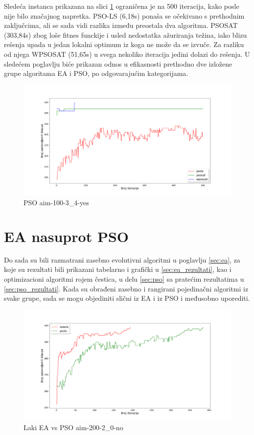\documentclass[a4paper]{article}
\begin{document}
Sledeća instanca prikazana na slici \ref{img:pso-100-3-4-yes} ograničena je na 500 iteracija,
kako posle nije bilo značajnog napretka. PSO-LS (6,18s) ponaša se očekivano s prethodnim
zaključcima, ali se sada vidi razlika između preostala dva algoritma. 
PSOSAT (303,84s) zbog loše fitnes funckije i usled nedostatka ažuriranja težina,
iako blizu rešenja upada u jedan lokalni optimum iz koga ne može da se izvuče. 
Za razliku od njega WPSOSAT (51,65s) u svega nekoliko iteracija jedini dolazi do rešenja.
U sledećem poglavlju biće prikazan odnos u efikasnosti prethodno dve izložene grupe algoritama
EA i PSO, po odgovarajućim kategorijama.\\

\begin{figure}[h!]
\centering
\includegraphics[width=\textwidth]{pso-aim-100-3_4-yes.png}
\caption{PSO aim-100-3\_4-yes}\label{img:pso-100-3-4-yes}
\end{figure}


\section{EA nasuprot PSO}
\label{EAvsPSO}
Do sada su bili razmatrani zasebno evolutivni algoritmi u poglavlju \ref{sec:ea}, za 
koje su rezultati bili prikazani tabelarno i grafički u \ref{sec:ea_rezultati}, kao i
optimizacioni algoritmi rojem čestica, u delu \ref{sec:pso} sa pratećim rezultatima u 
\ref{sec:pso_rezultati}. Kada su obrađeni zasebno i rangirani pojedinačni
algoritmi iz svake grupe, sada se mogu objediniti slični iz EA i iz PSO i međusobno 
uporediti.

\begin{figure}[h!]
\centering
\includegraphics[width=\textwidth]{ea-pso-aim-200-2_0-no.png}
\caption{Laki EA vs PSO aim-200-2\_0-no}\label{img:EAvsPSO-200-2_0-no}
\end{figure}
\end{document}
